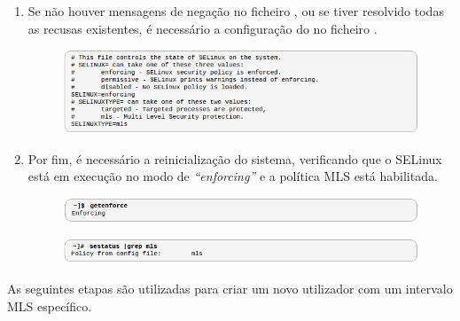 \documentclass[../tp2.tex]{subfiles}
\begin{document}
\begin{enumerate}
\item Se não houver mensagens de negação no ficheiro , ou se tiver resolvido todas as recusas existentes, é necessário a configuração do  no ficheiro .\par
\begin{figure}[H]
\centering
\captionsetup{justification=centering,margin=2cm}
\centerline{\includegraphics[scale=0.7]{../imagens/enforce.png}}
\end{figure}

\item Por fim, é necessário a reinicialização do sistema, verificando que o SELinux está em execução no modo de \textit{``enforcing''} e a política MLS está habilitada.\par
\begin{figure}[H]
\centering
\captionsetup{justification=centering,margin=2cm}
\centerline{\includegraphics[scale=0.7]{../imagens/enforceEnable.png}}
\end{figure}
\begin{figure}[H]
\centering
\captionsetup{justification=centering,margin=2cm}
\centerline{\includegraphics[scale=0.7]{../imagens/mls.png}}
\end{figure}
\end{enumerate}

As seguintes etapas são utilizadas para criar um novo utilizador com um intervalo MLS específico.\par
\end{document}
